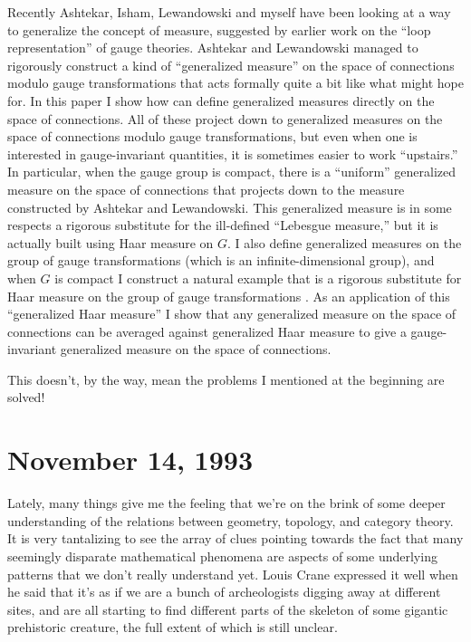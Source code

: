\documentclass[12pt]{article}
\begin{document}
Recently Ashtekar, Isham, Lewandowski and myself have been looking at a
way to generalize the concept of measure, suggested by earlier work on
the ``loop representation'' of gauge theories. Ashtekar and Lewandowski
managed to rigorously construct a kind of ``generalized measure'' on the
space of connections modulo gauge transformations that acts formally
quite a bit like what might hope for. In this paper I show how can
define generalized measures directly on the space of connections. All of
these project down to generalized measures on the space of connections
modulo gauge transformations, but even when one is interested in
gauge-invariant quantities, it is sometimes easier to work ``upstairs.''
In particular, when the gauge group is compact, there is a ``uniform''
generalized measure on the space of connections that projects down to
the measure constructed by Ashtekar and Lewandowski. This generalized
measure is in some respects a rigorous substitute for the ill-defined
``Lebesgue measure,'' but it is actually built using Haar measure on
\(G\). I also define generalized measures on the group of gauge
transformations (which is an infinite-dimensional group), and when \(G\)
is compact I construct a natural example that is a rigorous substitute
for Haar measure on the group of gauge transformations . As an
application of this ``generalized Haar measure'' I show that any
generalized measure on the space of connections can be averaged against
generalized Haar measure to give a gauge-invariant generalized measure
on the space of connections.

This doesn't, by the way, mean the problems I mentioned at the beginning
are solved!



\hypertarget{week25}{%
\section{November 14, 1993}\label{week25}}

Lately, many things give me the feeling that we're on the brink of some
deeper understanding of the relations between geometry, topology, and
category theory. It is very tantalizing to see the array of clues
pointing towards the fact that many seemingly disparate mathematical
phenomena are aspects of some underlying patterns that we don't really
understand yet. Louis Crane expressed it well when he said that it's as
if we are a bunch of archeologists digging away at different sites, and
are all starting to find different parts of the skeleton of some
gigantic prehistoric creature, the full extent of which is still
unclear.
\end{document}
